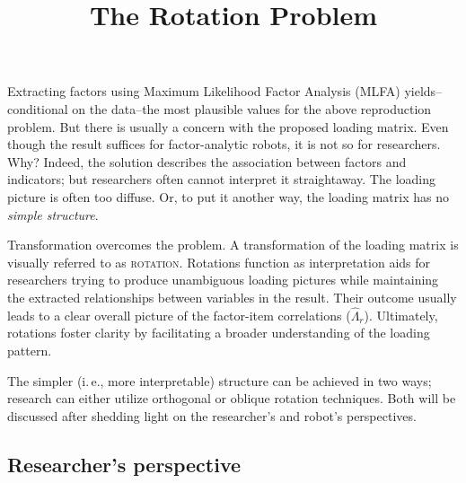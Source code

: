 \documentclass[jou, 11pt]{apa7}
\title{The Rotation Problem}
\begin{document}
\maketitle

Extracting factors using Maximum Likelihood Factor Analysis (MLFA)
yields--conditional on the data--the most plausible values for the above
reproduction problem. But there is usually a concern with the proposed loading
matrix. Even though the result suffices for factor-analytic robots, it is not
so for researchers. Why? Indeed, the solution describes the association between
factors and indicators; but researchers often cannot interpret it straightaway.
The loading picture is often too diffuse. Or, to put it another way, the
loading matrix has no \textit{simple
  structure}.

Transformation overcomes the problem. A transformation of the loading matrix is
visually referred to as \textsc{rotation}. Rotations function as interpretation
aids for researchers trying to produce unambiguous loading pictures while
maintaining the extracted relationships between variables in the result. Their
outcome usually leads to a clear overall picture of the factor-item
correlations ($\hat\Lambda_r$). Ultimately, rotations foster clarity by
facilitating a broader understanding of the loading pattern.

The simpler (i.\,e., more interpretable) structure can be achieved in two ways;
research can either utilize orthogonal or oblique rotation techniques. Both
will be discussed after shedding light on the researcher’s and robot’s
perspectives.

\subsection{Researcher’s perspective}
\end{document}
